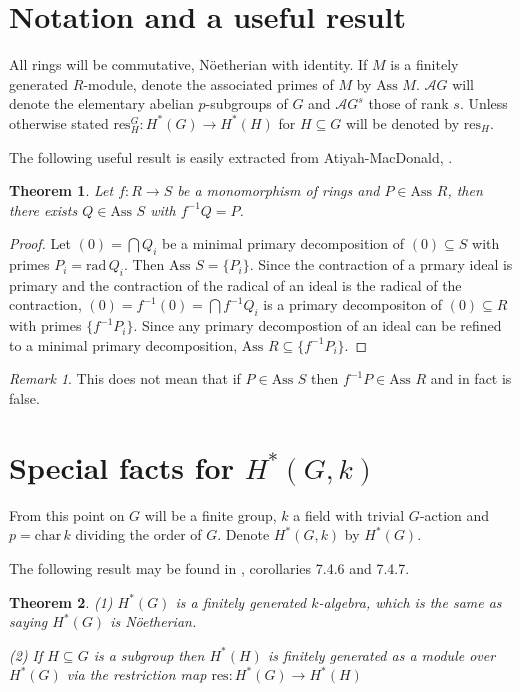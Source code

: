 \documentclass[reqno]{amsart}
\theoremstyle{plain}%
\newtheorem{thm}{Theorem}[section]
\theoremstyle{definition}
\theoremstyle{remark}
\newtheorem{remark}{Remark}
\newcommand\sub{\subseteq}
\newcommand\mc[1]{\mathcal #1}
\newcommand\as{\text{Ass}\,}
\newcommand\fg{finitely generated }
\newcommand\res{\text{res}}
\begin{document}
\section*{Notation and a useful result}

All rings will be commutative, N\"oetherian with identity. If $M$ is a \fg $R$-module, denote the associated primes of $M$ by $\as\,M$. $\mc AG$ will denote the elementary abelian $p$-subgroups of $G$ and $\mc AG^s$ those of rank $s$.
Unless otherwise stated $\res^G_H:H^*(G)\to H^*(H)$ for $H\sub G$ will be denoted by $\res_H$.

\medskip
The following useful result is easily extracted from Atiyah-MacDonald, \cite{AM}.

\begin{thm}\label{non} Let $f:R\to S$ be a monomorphism of rings and $P\in\as\,R$, then there exists $Q\in\as\, S$ with $f^{-1}Q=P$.\end{thm}
\begin{proof} Let $(0)=\bigcap Q_i$ be a minimal primary decomposition of $(0)\sub S$ with primes $P_i=\text{rad}\, Q_i$. Then $\as\,S=\{P_i\}$.  Since the contraction of a prmary ideal is primary and the contraction of the radical of an ideal is the radical of the contraction, $(0)=f^{-1}(0)=\bigcap f^{-1}Q_i$ is a primary decompositon of $(0)\sub R$ with primes $\{f^{-1}P_i\}$. Since any primary decompostion of an ideal can be refined to a minimal primary decomposition, $\as\,R\sub\{f^{-1}P_i\}$. 
\end{proof} 

\begin{remark} This does not mean that if $P\in\as\,S$ then $f^{-1}P\in\as\,R$ and in fact is false.\end{remark}


\section*{Special facts for $H^*(G,k)$}

From this point on $G$ will be a finite group, $k$ a field with trivial $G$-action and $p=\text{char}\,k$ dividing the order of $G$. Denote $H^*(G,k)$ by $H^*(G)$.
\medskip 

The following result may be found in \cite{E}, corollaries 7.4.6 and 7.4.7.

\begin{thm}\label{Ev}(1) $H^*(G)$ is a \fg $k$-algebra, which is the same as saying $H^*(G)$ is N\"oetherian.
\par (2) If $H\sub G$ is a subgroup then $H^*(H)$ is \fg as a module over $H^*(G)$ via the restriction map $\res:H^*(G)\to H^*(H)$\end{thm}
\end{document}
